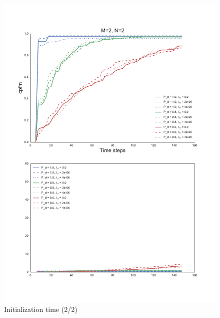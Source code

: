 \begin{figure}
\centering
\includegraphics[height = .9\textheight]{Figures/plots/Scenario1_Init-Time(2-2).pdf}
\caption{Initialization time (2/2)}\label{fig:init_time_2-2}
\end{figure}

